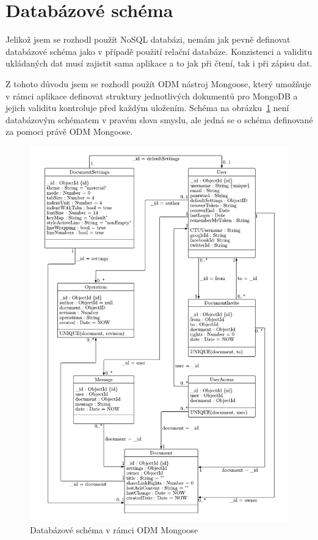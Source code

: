 
\section{Databázové schéma}\label{sec:databázovéSchéma}

Jelikož jsem se rozhodl použít \gls{NoSQL} databázi, nemám jak pevně definovat databázové schéma jako v případě použití relační databáze.
Konzistenci a validitu ukládaných dat musí zajistit sama aplikace a to jak při čtení, tak i při zápisu dat.

Z tohoto důvodu jsem se rozhodl použít \gls{ODM} nástroj Mongoose, který umožňuje v rámci aplikace definovat struktury jednotlivých dokumentů pro MongoDB a jejich validitu kontroluje před každým uložením.
Schéma na obrázku~\ref{fig:DB_model} není databázovým schématem v pravém slova smyslu, ale jedná se o schéma definované za pomoci právě \gls{ODM} Mongoose.

\begin{figure}[ht!]
    \centering
    \includegraphics[width=.95\textwidth]{partials/navrh/DB_model.pdf}
    \caption{Databázové schéma v rámci ODM Mongoose}\label{fig:DB_model}
\end{figure}

